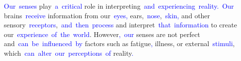 \begin{tcolorbox}[colframe=gray!70!black,colback=white, title=Sample 1]
{}\textcolor{blue}{Our}\textcolor{blue}{~senses} play\textcolor{blue}{~a}\textcolor{blue}{~critical} role in interpreting\textcolor{blue}{~and}\textcolor{blue}{~experiencing}\textcolor{blue}{~reality}\textcolor{blue}{.}\textcolor{blue}{~Our} brains\textcolor{blue}{~receive} information from our\textcolor{blue}{~eyes}\textcolor{blue}{,} ears,\textcolor{blue}{~nose},\textcolor{blue}{~skin}\textcolor{blue}{,} and other sensory\textcolor{blue}{~receptors},\textcolor{blue}{~and}\textcolor{blue}{~then}\textcolor{blue}{~process} and interpret\textcolor{blue}{~that}\textcolor{blue}{~information} to create our\textcolor{blue}{~experience}\textcolor{blue}{~of}\textcolor{blue}{~the}\textcolor{blue}{~world}. However\textcolor{blue}{,}\textcolor{blue}{~our} senses are not perfect and\textcolor{blue}{~can}\textcolor{blue}{~be}\textcolor{blue}{~influenced}\textcolor{blue}{~by} factors such as fatigue\textcolor{blue}{,} illness, or external\textcolor{blue}{~stimuli}, which\textcolor{blue}{~can}\textcolor{blue}{~alter}\textcolor{blue}{~our}\textcolor{blue}{~perceptions}\textcolor{blue}{~of} reality\textcolor{blue}{.}\textcolor{blue}{}
\end{tcolorbox}




